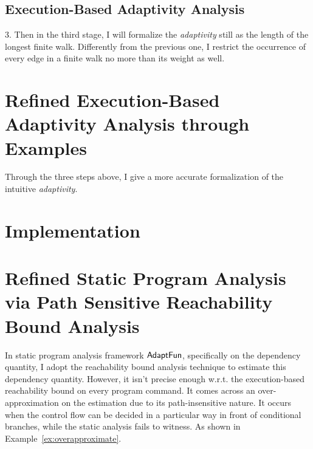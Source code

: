 \subsection{Execution-Based Adaptivity Analysis}
\label{subsec:refine-exe-adapt}
%
3. Then in the third stage, I will formalize the \emph{adaptivity} still as the 
length of the longest finite walk. Differently from the previous one, I restrict 
the occurrence of every edge in a finite walk no more than its weight as well.
%
\section{Refined Execution-Based Adaptivity Analysis through Examples}
\label{sec:dynamic-examples}
Through the three steps above, I give a more accurate formalization of the intuitive \emph{adaptivity}.


\section{Implementation}
\label{sec:dynamic-implementation}
%
\section{Refined Static Program Analysis via Path Sensitive Reachability Bound Analysis}
\label{sec:refine-static}
In static program analysis framework $\textsf{AdaptFun}$, specifically on the dependency quantity, 
I adopt the reachability bound analysis technique to estimate this dependency quantity.
However, it isn't precise enough w.r.t. the execution-based reachability bound on every program command.
It comes across an over-approximation on the estimation due to its path-insensitive nature. 
It occurs when the control flow can be decided in a particular way in front of conditional branches, 
while the static analysis fails to witness. 
As shown in Example~\ref{ex:overapproximate}.


